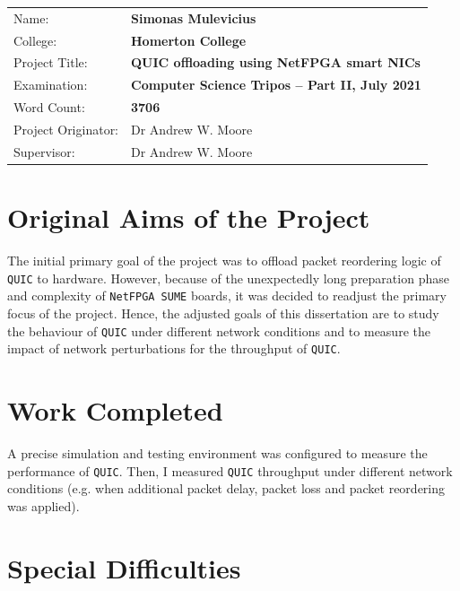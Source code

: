 \documentclass[12pt,a4paper,twoside,openright]{report}
\begin{document}
{\large
\begin{tabular}{ll}
Name:               & \bf Simonas Mulevicius                       \\
College:            & \bf Homerton College                     \\
Project Title:      & \bf QUIC offloading using NetFPGA smart NICs \\
Examination:        & \bf Computer Science Tripos -- Part II, July 2021  \\
Word Count:         & \bf 3706\footnotemark[1] \\
Project Originator: & Dr Andrew W. Moore                \\
Supervisor:         & Dr Andrew W. Moore                \\ 
\end{tabular}
}



\section*{Original Aims of the Project}

The initial primary goal of the project was to offload packet reordering logic of \texttt{QUIC} to hardware.
However, because of the unexpectedly long preparation phase and complexity of \texttt{NetFPGA SUME} boards, it was decided to readjust the primary focus of the project.
Hence, the adjusted goals of this dissertation are to study the behaviour of \texttt{QUIC} under different network conditions and to measure the impact of network perturbations for the throughput of \texttt{QUIC}.

\section*{Work Completed}

A precise simulation and testing environment was configured to measure the performance of \texttt{QUIC}.
Then, I measured \texttt{QUIC} throughput under different network conditions (e.g. when additional packet delay, packet loss and packet reordering was applied).

\section*{Special Difficulties}
\end{document}

